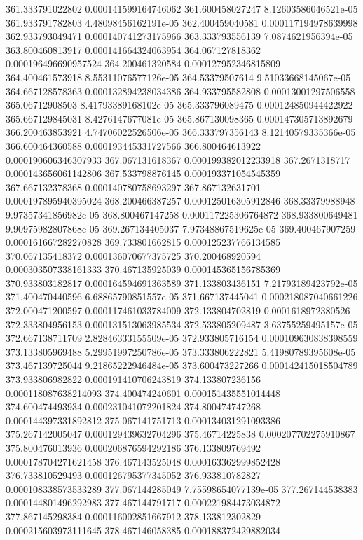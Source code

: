 {361.333791022802 0.000141599164746062
361.600458027247 8.12603586046521e-05
361.933791782803 4.48098456162191e-05
362.400459040581 0.000117194978639998
362.933793049471 0.000140741273175966
363.333793556139 7.0874621956394e-05
363.800460813917 0.000141664324063954
364.067127818362 0.000196496690957524
364.200461320584 0.000127952346815809
364.400461573918 8.55311076577126e-05
364.53379507614 9.51033668145067e-05
364.667128578363 0.000132894238034386
364.933795582808 0.00013001297506558
365.06712908503 8.41793389168102e-05
365.333796089475 0.000124850944422922
365.667129845031 8.4276147677081e-05
365.867130098365 0.000147305713892679
366.200463853921 4.74706022526506e-05
366.333797356143 8.12140579335366e-05
366.600464360588 0.000193445331727566
366.800464613922 0.000190606346307933
367.067131618367 0.000199382012233918
367.2671318717 0.000143656061142806
367.533798876145 0.000193371054545359
367.667132378368 0.000140780758693297
367.867132631701 0.000197895940395024
368.200466387257 0.000125016305912846
368.33379988948 9.97357341856982e-05
368.800467147258 0.000117225306764872
368.933800649481 9.90975982807868e-05
369.267134405037 7.97348867519625e-05
369.400467907259 0.000161667282270828
369.733801662815 0.000125237766134585
370.067135418372 0.000136070677375725
370.200468920594 0.000303507338161333
370.467135925039 0.000145365156785369
370.933803182817 0.000164594691363589
371.133803436151 7.21793189423792e-05
371.400470440596 6.68865790851557e-05
371.667137445041 0.000218087040661226
372.000471200597 0.000117461033784009
372.133804702819 0.0001618972380526
372.333804956153 0.000131513063985534
372.533805209487 3.63755259495157e-05
372.667138711709 2.82846333155509e-05
372.933805716154 0.000109630838398559
373.133805969488 5.29951997250786e-05
373.333806222821 5.41980789395608e-05
373.467139725044 9.21865222946484e-05
373.600473227266 0.000142415018504789
373.933806982822 0.000191410706243819
374.133807236156 0.000118087638214093
374.400474240601 0.000151435551014448
374.600474493934 0.000231041072201824
374.800474747268 0.000144397331892812
375.067141751713 0.000134031291093386
375.267142005047 0.000129439632704296
375.46714225838 0.000207702275910867
375.800476013936 0.000206876594292186
376.133809769492 0.000178704271621458
376.467143525048 0.000163362999852428
376.733810529493 0.000126795377345052
376.933810782827 0.000108338573533289
377.067144285049 7.75598654077139e-05
377.267144538383 0.000144801496292983
377.467144791717 0.000221984473034872
377.867145298384 0.000116002851667912
378.133812302829 0.000215603973111645
378.467146058385 0.000188372429882034
}
